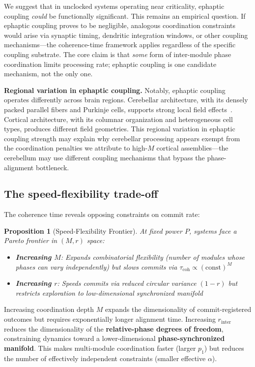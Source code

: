 \documentclass[12pt]{article}
\newtheorem{proposition}{Proposition}
\begin{document}
We suggest that in unclocked systems operating near criticality, ephaptic coupling \emph{could} be functionally significant. This remains an empirical question. If ephaptic coupling proves to be negligible, analogous coordination constraints would arise via synaptic timing, dendritic integration windows, or other coupling mechanisms---the coherence-time framework applies regardless of the specific coupling substrate. The core claim is that \emph{some} form of inter-module phase coordination limits processing rate; ephaptic coupling is one candidate mechanism, not the only one.

\textbf{Regional variation in ephaptic coupling.} Notably, ephaptic coupling operates differently across brain regions. Cerebellar architecture, with its densely packed parallel fibers and Purkinje cells, supports strong local field effects~\cite{han2018}. Cortical architecture, with its columnar organization and heterogeneous cell types, produces different field geometries. This regional variation in ephaptic coupling strength may explain why cerebellar processing appears exempt from the coordination penalties we attribute to high-$M$ cortical assemblies---the cerebellum may use different coupling mechanisms that bypass the phase-alignment bottleneck.

\subsection{The speed-flexibility trade-off}

The coherence time reveals opposing constraints on commit rate:

\begin{proposition}[Speed-Flexibility Frontier]\label{prop:tradeoff}
At fixed power $P$, systems face a Pareto frontier in $(M,r)$ space:
\begin{itemize}
\item \textbf{Increasing $M$}: Expands combinatorial flexibility (number of modules whose phases can vary independently) but slows commits via $\tau_{\mathrm{coh}} \propto (\mathrm{const})^{M}$
\item \textbf{Increasing $r$}: Speeds commits via reduced circular variance $(1-r)$ but restricts exploration to low-dimensional synchronized manifold
\end{itemize}
\end{proposition}

Increasing coordination depth $M$ expands the dimensionality of commit-registered outcomes but requires exponentially longer alignment time. Increasing $r_{\mathrm{inter}}$ reduces the dimensionality of the \textbf{relative-phase degrees of freedom}, constraining dynamics toward a lower-dimensional \textbf{phase-synchronized manifold}. This makes multi-module coordination faster (larger $p_1$) but reduces the number of effectively independent constraints (smaller effective $\alpha$).
\end{document}
